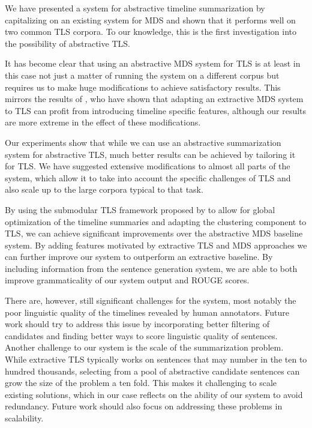 \documentclass[a4paper,BCOR=10mm]{report}
\numberwithin{lemma}{chapter}
\numberwithin{definition}{chapter}
\begin{document}
We have presented a system for abstractive timeline summarization by capitalizing on an existing system for MDS and shown that it performs well on two common TLS corpora. To our knowledge, this is the first investigation into the possibility of abstractive TLS.

It has become clear that using an abstractive MDS system for TLS is at least in this case not just a matter of running the system on a different corpus but requires us to make huge modifications to achieve satisfactory results. This mirrors the results of \citet{markert}, who have shown that adapting an extractive MDS system to TLS can profit from introducing timeline specific features, although our results are more extreme in the effect of these modifications.

Our experiments show that while we can use an abstractive summarization system for abstractive TLS, much better results can be achieved by tailoring it for TLS.
We have suggested extensive modifications to almost all parts of the system, which allow it to take into account the specific challenges of TLS and also scale up to the large corpora typical to that task.

By using the submodular TLS framework proposed by \citet{markert} to allow for global optimization of the timeline summaries and adapting the clustering component to TLS, we can achieve significant improvements over the abstractive MDS baseline system.
By adding features motivated by extractive TLS and MDS approaches we can further improve our system to outperform an extractive baseline.
By including information from the sentence generation system, we are able to both improve grammaticality of our system output and ROUGE scores.

There are, however, still significant challenges for the system, most notably the poor linguistic quality of the timelines revealed by human annotators.
Future work should try to address this issue by incorporating better filtering of candidates and finding better ways to score linguistic quality of sentences.
Another challenge to our system is the scale of the summarization problem. While extractive TLS typically works on sentences that may number in the ten to hundred thousands, selecting from a pool of abstractive candidate sentences can grow the size of the problem a ten fold. This makes it challenging to scale existing solutions, which in our case reflects on the ability of our system to avoid redundancy.
Future work should also focus on addressing these problems in scalability.
\end{document}
